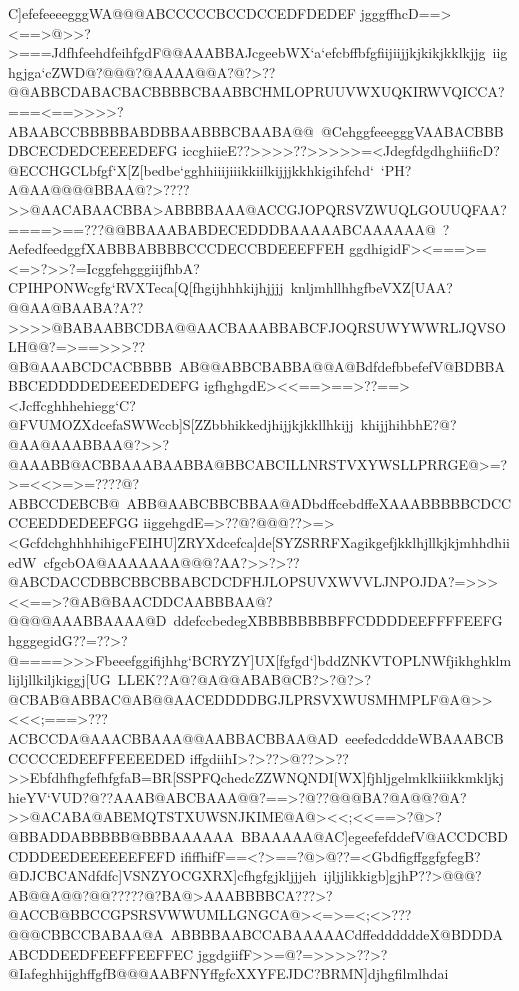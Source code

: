 {{{ C]efefeeeegggWA@@@ABCCCCCBCCDCCEDFDEDEF}
 \hbox{jgggffhcD==><==>@>>?>===JdfhfeehdfeihfgdF@@AAABBAJcgeebWX`a`efcbffbfgfiijiijjkjkikjkklkjjg%
 iighgjga`cZWD@?@@@?@AAAA@@A?@?>??@@ABBCDABACBACBBBBCBAABBCHMLOPRUUVWXUQKIRWVQICCA?===<==>>>>?ABAABCCBBBBBABDBBAABBBCBAABA@@%
 @CehggfeeegggVAABACBBBDBCECDEDCEEEEDEFG}
 \hbox{iccghiieE??>>>>??>>>>>=<JdegfdgdhghiificD?@ECCHGCLbfgf`X[Z[bedbe`gghhiiijiiikkiilkijjjkkhkigihfchd`%
 `PH?A@AA@@@@BBAA@?>????>>@AACABAACBBA>ABBBBAAA@ACCGJOPQRSVZWUQLGOUUQFAA?====>==???@@BBAAABABDECEDDDBAAAAABCAAAAAA@%
 ?AefedfeedggfXABBBABBBBCCCDECCBDEEEFFEH}
 \hbox{ggdhigidF><===>=<=>?>>?=IcggfehgggiijfhbA?CPIHPONWcgfg`RVXTeca[Q[fhgijhhhkijhjjjj%
 knljmhllhhgfbeVXZ[UAA?@@AA@BAABA?A??>>>>@BABAABBCDBA@@AACBAAABBABCFJOQRSUWYWWRLJQVSOLH@@?=>==>>>??@B@AAABCDCACBBBB%
 AB@@ABBCBABBA@@A@BdfdefbbefefV@BDBBABBCEDDDDEDEEEDEDEFG}
 \hbox{igfhghgdE><<==>==>??==><Jcffcghhhehiegg`C?@FVUMOZXdcefaSWWccb]S[ZZbbhikkedjhijjkjkkllhkijj%
 khijjhihbhE?@?@AA@AAABBAA@?>>?@AAABB@ACBBAAABAABBA@BBCABCILLNRSTVXYWSLLPRRGE@>=?>=<<>=>=????@?ABBCCDEBCB@%
 ABB@AABCBBCBBAA@ADbdffcebdffeXAAABBBBBCDCCCCEEDDEDEEFGG}
 \hbox{iiggehgdE=>??@?@@@??>=><GcfdchghhhhihigcFEIHU]ZRYXdcefca]de[SYZSRRFXagikgefjkklhjllkjkjmhhdhiiedW%
 cfgcbOA@AAAAAAA@@@?AA?>>?>??@ABCDACCDBBCBBCBBABCDCDFHJLOPSUVXWVVLJNPOJDA?=>>><<==>?@AB@BAACDDCAABBBAA@?@@@@AAABBAAAA@D%
 ddefccbedegXBBBBBBBBFFCDDDDEEFFFFEEFG}
 \hbox{hgggegidG??=??>?@====>>>Fbeeefggifijhhg`BCRYZY]UX[fgfgd`]bddZNKVTOPLNWfjikhghklmlijljllkiljkiggj[UG%
 LLEK??A@?@A@@ABAB@CB?>?@?>?@CBAB@ABBAC@AB@@AACEDDDDBGJLPRSVXWUSMHMPLF@A@>><<<;===>???ACBCCDA@AAACBBAAA@@AABBACBBAA@AD%
 eeefedcdddeWBAAABCBCCCCCEDEEFFEEEEDED}
 \hbox{iffgdiihI>?>??>@??>>??>>EbfdhfhgfefhfgfaB=BR[SSPFQchedcZZWNQNDI[WX]fjhljgelmklkiiikkmkljkj%
 hieYV`VUD?@??AAAB@ABCBAAA@@?==>?@??@@@BA?@A@@?@A?>>@ACABA@ABEMQTSTXUWSNJKIME@A@><<;<<==>?@>?@BBADDABBBBB@BBBAAAAAA%
 BBAAAAA@AC]egeefefddefV@ACCDCBDCDDDEEDEEEEEEFEFD}
 \hbox{ififfhifF==<?>==?@>@??=<GbdfigffggfgfegB?@DJCBCANdfdfc]VSNZYOCGXRX]cfhgfgjkljjjeh%
 ijljjlikkigb]gjhP??>@@@?AB@@A@@?@@?????@?BA@>AAABBBBCA???>?@ACCB@BBCCGPSRSVWWUMLLGNGCA@><=>=<;<>???@@@CBBCCBABAA@A%
 ABBBBAABCCABAAAAACdffeddddddeX@BDDDAABCDDEEDFEEFFEEFFEC}
 \hbox{jggdgiifF>>=@?=>>>>??>?@IafeghhijghffgfB@@@AABFNYffgfcXXYFEJDC?BRMN]djhgfilmlhdai%
}}}
